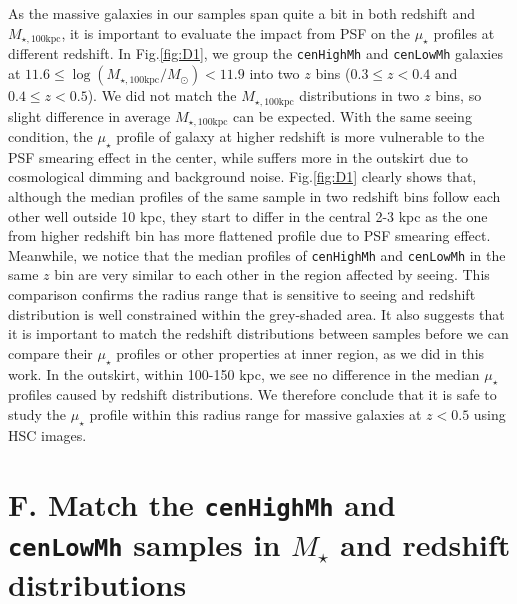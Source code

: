 \documentclass{emulateapj}
\def\rbcg{\texttt{cenHighMh}}
\def\nbcg{\texttt{cenLowMh}}
\def\mstar{{$M_{\star}$}}
\def\mtot{{$M_{\star,100\mathrm{kpc}}$}}
\def\logmtot{{$\log (M_{\star,100\mathrm{kpc}}/M_{\odot})$}}
\def\mden{{$\mu_{\star}$}}
\begin{document}
\begin{CJK*}{UTF8}{gbsn}
    As the massive galaxies in our samples span quite a bit in both redshift and \mtot{}, 
    it is important to evaluate the impact from PSF on the \mden{} profiles at different 
    redshift. 
    In Fig.\ref{fig:D1}, we group the \rbcg{} and \nbcg{} galaxies at  
    $11.6 \le$\logmtot$< 11.9$ into two $z$ bins ($0.3\leq z<0.4$ and 
    $0.4\leq z<0.5$). 
    We did not match the \mtot{} distributions in two $z$ bins, so slight difference in 
    average \mtot{} can be expected. 
    With the same seeing condition, the \mden{} profile of galaxy at higher redshift is 
    more vulnerable to the PSF smearing effect in the center, while suffers more in the 
    outskirt due to cosmological dimming and background noise.  
    Fig.\ref{fig:D1} clearly shows that, although the median profiles of the same sample 
    in two redshift bins follow each other well outside 10 kpc, they start to differ in 
    the central 2-3 kpc as the one from higher redshift bin has more flattened profile 
    due to PSF smearing effect.  
    Meanwhile, we notice that the median profiles of \rbcg{} and \nbcg{} in the 
    same $z$ bin are very similar to each other in the region affected by seeing.   
    This comparison confirms the radius range that is sensitive to seeing and 
    redshift distribution is well constrained within the grey-shaded area.
    It also suggests that it is important to match the redshift distributions between 
    samples before we can compare their \mden{} profiles or other properties at inner 
    region, as we did in this work. 
    In the outskirt, within 100-150 kpc, we see no difference in the median \mden{} 
    profiles caused by redshift distributions. 
    We therefore conclude that it is safe to study the \mden{} profile within this 
    radius range for massive galaxies at $z<0.5$ using HSC images. 

\section{F. Match the \rbcg{} and \nbcg{} samples in \mstar{} and redshift distributions}
    \label{app:match}
    


\end{CJK*}
\end{document}
